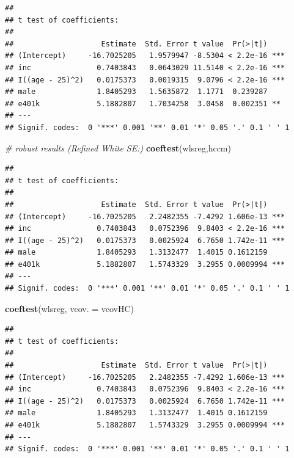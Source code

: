 \documentclass[]{book}
\newenvironment{Shaded}{\begin{snugshade}}{\end{snugshade}}
\newcommand{\CommentTok}[1]{\textcolor[rgb]{0.56,0.35,0.01}{\textit{#1}}}
\newcommand{\DataTypeTok}[1]{\textcolor[rgb]{0.13,0.29,0.53}{#1}}
\newcommand{\KeywordTok}[1]{\textcolor[rgb]{0.13,0.29,0.53}{\textbf{#1}}}
\newcommand{\NormalTok}[1]{#1}
\begin{document}
\begin{verbatim}
## 
## t test of coefficients:
## 
##                    Estimate  Std. Error t value  Pr(>|t|)    
## (Intercept)     -16.7025205   1.9579947 -8.5304 < 2.2e-16 ***
## inc               0.7403843   0.0643029 11.5140 < 2.2e-16 ***
## I((age - 25)^2)   0.0175373   0.0019315  9.0796 < 2.2e-16 ***
## male              1.8405293   1.5635872  1.1771  0.239287    
## e401k             5.1882807   1.7034258  3.0458  0.002351 ** 
## ---
## Signif. codes:  0 '***' 0.001 '**' 0.01 '*' 0.05 '.' 0.1 ' ' 1
\end{verbatim}

\begin{Shaded}
\begin{Highlighting}[]
\CommentTok{# robust results (Refined White SE:)}
\KeywordTok{coeftest}\NormalTok{(wlsreg,hccm)}
\end{Highlighting}
\end{Shaded}

\begin{verbatim}
## 
## t test of coefficients:
## 
##                    Estimate  Std. Error t value  Pr(>|t|)    
## (Intercept)     -16.7025205   2.2482355 -7.4292 1.606e-13 ***
## inc               0.7403843   0.0752396  9.8403 < 2.2e-16 ***
## I((age - 25)^2)   0.0175373   0.0025924  6.7650 1.742e-11 ***
## male              1.8405293   1.3132477  1.4015 0.1612159    
## e401k             5.1882807   1.5743329  3.2955 0.0009994 ***
## ---
## Signif. codes:  0 '***' 0.001 '**' 0.01 '*' 0.05 '.' 0.1 ' ' 1
\end{verbatim}

\begin{Shaded}
\begin{Highlighting}[]
\KeywordTok{coeftest}\NormalTok{(wlsreg, }\DataTypeTok{vcov. =}\NormalTok{ vcovHC)}
\end{Highlighting}
\end{Shaded}

\begin{verbatim}
## 
## t test of coefficients:
## 
##                    Estimate  Std. Error t value  Pr(>|t|)    
## (Intercept)     -16.7025205   2.2482355 -7.4292 1.606e-13 ***
## inc               0.7403843   0.0752396  9.8403 < 2.2e-16 ***
## I((age - 25)^2)   0.0175373   0.0025924  6.7650 1.742e-11 ***
## male              1.8405293   1.3132477  1.4015 0.1612159    
## e401k             5.1882807   1.5743329  3.2955 0.0009994 ***
## ---
## Signif. codes:  0 '***' 0.001 '**' 0.01 '*' 0.05 '.' 0.1 ' ' 1
\end{verbatim}
\end{document}
